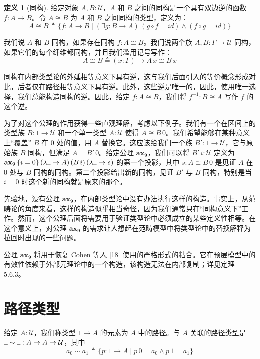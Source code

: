 \documentclass{ctexrep}
\theoremstyle{plain}
\theoremstyle{definition}
\newtheorem{definition}[theorem]{定义}
\theoremstyle{remark}
\newcommand{\ax}[1]{\mathbf{ax_{#1}}}
\newcommand{\ul}{{\rule[0ex]{0.5em}{0.4pt}}} %
\begin{document}
\begin{definition}[同构]
给定对象 $A, B : \mathcal{U}$，$A$ 和 $B$ 之间的同构是一个具有双边逆的函数 $f : A \to B$。令 $A \cong B$ 为 $A$ 和 $B$ 之间同构的类型，定义为：
\[
A \cong B \triangleq \{f : A \to B \mid (\exists g : B \to A)\, (g \circ f = id) \land (f \circ g = id)\}
\]

我们说 $A$ 和 $B$ 同构，如果存在同构 $f : A \cong B$。我们说两个族 $A, B : \Gamma \to \mathcal{U}$ 同构，如果它们的每个纤维都同构，并且我们滥用记号写作：
\[
A \cong B \triangleq (x : \Gamma) \to A\,x \cong B\,x
\]
\end{definition}

同构在内部类型论的外延相等意义下具有逆，这与我们后面引入的等价概念形成对比，后者仅在路径相等意义下具有逆。此外，这些逆是唯一的，因此，使用唯一选择，我们总能构造同构的逆。因此，给定 $f : A \cong B$，我们将 $f^{-1} : B \cong A$ 写作 $f$ 的这个逆。

为了对这个公理的作用获得一些直观理解，考虑以下例子。我们有一个在区间上的类型族 $B : \mathtt{I} \to \mathcal{U}$ 和一个单一类型 $A : \mathcal{U}$ 使得 $A \cong B\,0$。我们希望能够在某种意义上``覆盖'' $B$ 在 $0$ 处的值，用 $A$ 替换它。这应该给我们一个族 $B' : \mathtt{I} \to \mathcal{U}$，它与原始族 $B$ 同构，但满足 $A = B'\,0$。给定公理 $\ax{9}$，我们可以将 $B'\,i : \mathcal{U}$ 定义为 $\ax{9}\,\{i=0\}\,(\lambda\ul  \to A)\,(B\,i)\,(\lambda\ul  \to s)$ 的第一个投影，其中 $s : A \cong B\,0$ 是见证 $A$ 在 $0$ 处与 $B$ 同构的同构。第二个投影给出新的同构，见证 $B'$ 与 $B$ 同构，特别是当 $i = 0$ 时这个新的同构就是原来的那个。

先验地，没有公理 $\ax{9}$，在内部类型论中没有办法执行这样的构造。事实上，从范畴论的角度来看，这样的构造似乎相当奇怪，因为我们通常只在``同构意义下''工作。然而，这个公理后面将需要用于验证类型论中必须成立的某些定义性相等。在这个意义上，对公理 $\ax{9}$ 的需求让人想起在范畴模型中将类型论中的替换解释为拉回时出现的一些问题。

公理 $\ax{9}$ 将用于恢复 Cohen 等人 [18] 使用的严格形式的粘合。它在预层模型中的有效性依赖于外部元理论中的一个构造，该构造无法在内部复制；详见定理 5.6.3。

\section{路径类型}

给定 $A : \mathcal{U}$，我们称类型 $\mathtt{I} \to A$ 的元素为 $A$ 中的路径。与 $A$ 关联的路径类型是 $\ul \sim\ul  : A \to A \to \mathcal{U}$，其中
\begin{equation}
a_0 \sim a_1 \triangleq \{p : \mathtt{I} \to A \mid p\,0 = a_0 \land p\,1 = a_1\}
\end{equation}
\end{document}
